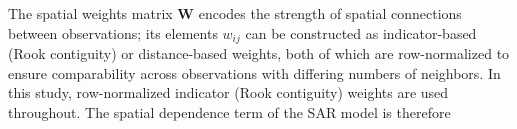 \documentclass{article}[11pt]
\begin{document}





The spatial weights matrix $\mathbf{W}$ encodes the strength of spatial connections between observations; its elements $w_{ij}$ can be constructed as indicator-based (Rook contiguity) or distance-based weights, both of which are row-normalized to ensure comparability across observations with differing numbers of neighbors. In this study, row-normalized indicator (Rook contiguity) weights are used throughout. The spatial dependence term of the SAR model is therefore
\end{document}

